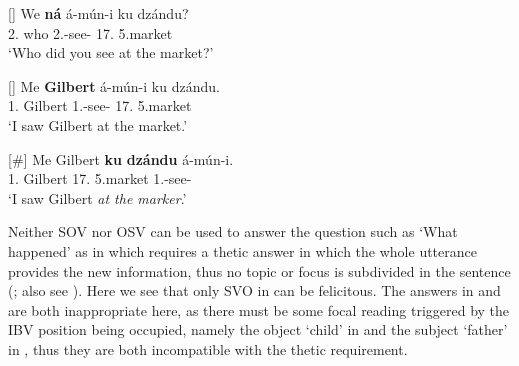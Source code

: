 \documentclass[output=paper,colorlinks,citecolor=brown,
]{langscibook}
\begin{document}
\begin{exe} 
    \ex \label{67}
    \begin{xlist}
\ex
[]{
\label{67a}
\gll
We \textbf{ná} á-mún-i ku dzándu?\\
2\Sg{}.\Pro{} who 2\Sg{}.\Pst{}-see-\Pst{} 17.\Loc{} 5.market\\
\trans ‘Who did you see at the market?’
}

\ex
[]{
\label{67b}
\gll
Me \textbf{Gilbert} á-mún-i ku dzándu.\\
1\Sg{}.\Pro{} Gilbert 1\Sg{}.\Pst{}-see-\Pst{} 17.\Loc{} 5.market\\
\trans ‘I saw Gilbert at the market.’
}

\ex
[\#]{
\label{67c}
\gll
Me Gilbert \textbf{ku} \textbf{dzándu} á-mún-i.\\
1\Sg{}.\Pro{} Gilbert 17.\Loc{} 5.market 1\Sg{}.\Pst{}-see-\Pst{}\\
\trans ‘I saw Gilbert \textit{at the marker}.’
}

    \end{xlist}
\end{exe}
Neither SOV nor OSV can be used to answer the question such as `What happened' as in  which requires a thetic answer in which the whole utterance provides the new information, thus no topic or focus is subdivided in the sentence (\citealt{Kuroda1972, Sasse1987, Sasse1996}; also see ). Here we see that only SVO in  can be felicitous. The answers in  and  are both inappropriate here, as there must be some focal reading triggered by the IBV position being occupied, namely the object `child' in  and the subject `father' in , thus they are both incompatible with the thetic requirement.
\end{document}
